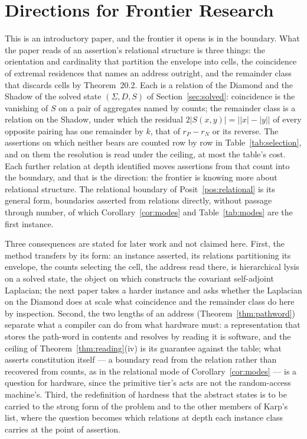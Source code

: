 \documentclass[pdflatex,sn-mathphys-num]{sn-jnl}
\theoremstyle{thmstyleone}%
\theoremstyle{thmstyletwo}%
\theoremstyle{thmstylethree}%
\newcommand{\YM}{\cite{Swanagon2026YangMills}}
\begin{document}
\section{Directions for Frontier Research}\label{sec:frontier}
This is an introductory paper, and the frontier it opens is in the boundary. What the paper reads of an assertion's relational structure is three things: the orientation and cardinality that partition the envelope into cells, the coincidence of extremal residences that names an address outright, and the remainder class that discards cells by Theorem~20.2. Each is a relation of the Diamond and the Shadow of the solved state $(\Sigma,D,S)$ of Section~\ref{sec:solved}: coincidence is the vanishing of $S$ on a pair of aggregates named by counts; the remainder class is a relation on the Shadow, under which the residual $2|S(x,y)|=\bigl||x|-|y|\bigr|$ of every opposite pairing has one remainder by $k$, that of $r_P-r_N$ or its reverse. The assertions on which neither bears are counted row by row in Table~\ref{tab:selection}, and on them the resolution is read under the ceiling, at most the table's cost. Each further relation at depth identified moves assertions from that count into the boundary, and that is the direction: the frontier is knowing more about relational structure. The relational boundary of Posit~\ref{pos:relational} is its general form, boundaries asserted from relations directly, without passage through number, of which Corollary~\ref{cor:modes} and Table~\ref{tab:modes} are the first instance.

Three consequences are stated for later work and not claimed here. First, the method transfers by its form: an instance asserted, its relations partitioning its envelope, the counts selecting the cell, the address read there, is hierarchical lysis on a solved state, the object on which \YM{} constructs the covariant self-adjoint Laplacian; the next paper takes a harder instance and asks whether the Laplacian on the Diamond does at scale what coincidence and the remainder class do here by inspection. Second, the two lengths of an address (Theorem~\ref{thm:pathword}) separate what a compiler can do from what hardware must: a representation that stores the path-word in contents and resolves by reading it is software, and the ceiling of Theorem~\ref{thm:reading}(iv) is its guarantee against the table; what asserts constitution itself --- a boundary read from the relation rather than recovered from counts, as in the relational mode of Corollary~\ref{cor:modes} --- is a question for hardware, since the primitive tier's acts are not the random-access machine's. Third, the redefinition of hardness that the abstract states is to be carried to the strong form of the problem and to the other members of Karp's list, where the question becomes which relations at depth each instance class carries at the point of assertion.
\end{document}
